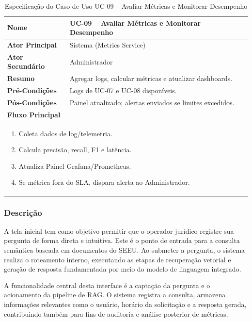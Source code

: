 \begin{table}[H]
\centering
\caption{Especificação do Caso de Uso UC-09 – Avaliar Métricas e Monitorar Desempenho}
\label{tab:uc09}
\begin{tabular}{|p{4cm}|p{11cm}|}
\hline
\textbf{Nome}        & UC-09 – Avaliar Métricas e Monitorar Desempenho \\ \hline
\textbf{Ator Principal} & Sistema (Metrics Service) \\ \hline
\textbf{Ator Secundário} & Administrador \\ \hline
\textbf{Resumo}      & Agregar logs, calcular métricas e atualizar dashboards. \\ \hline
\textbf{Pré-Condições} & Logs de UC-07 e UC-08 disponíveis. \\ \hline
\textbf{Pós-Condições} & Painel atualizado; alertas enviados se limites excedidos. \\ \hline
\multicolumn{2}{|l|}{\textbf{Fluxo Principal}} \\ \hline
\multicolumn{2}{|p{15cm}|}{%
\begin{enumerate}[leftmargin=*]
  \item Coleta dados de log/telemetria.
  \item Calcula precisão, recall, F1 e latência.
  \item Atualiza Painel Grafana/Prometheus.
  \item Se métrica fora do SLA, dispara alerta ao Administrador.
\end{enumerate}} \\ \hline
\end{tabular}
\end{table}


\subsubsection{Descrição}

A tela inicial tem como objetivo permitir que o operador jurídico registre sua pergunta de forma direta e intuitiva. Este é o ponto de entrada para a consulta semântica baseada em documentos do SEEU. Ao submeter a pergunta, o sistema realiza o roteamento interno, executando as etapas de recuperação vetorial e geração de resposta fundamentada por meio do modelo de linguagem integrado.

A funcionalidade central desta interface é a captação da pergunta e o acionamento da pipeline de RAG. O sistema registra a consulta, armazena informações relevantes como o usuário, horário da solicitação e a resposta gerada, contribuindo também para fins de auditoria e análise posterior de métricas.


